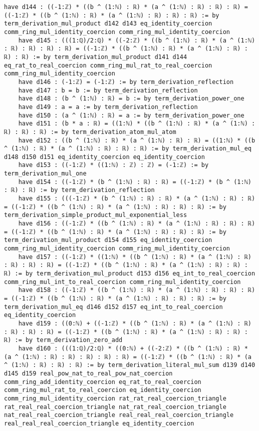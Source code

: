 \documentclass{article}
\begin{document}
\begin{tcolorbox}[colback=white!10, width=\linewidth]
\begin{lstlisting}[language=Lean4]
    have d144 : ((-1:ℤ) * ((b ^ (1:ℕ) : ℝ) * (a ^ (1:ℕ) : ℝ) : ℝ) : ℝ) = ((-1:ℤ) * ((b ^ (1:ℕ) : ℝ) * (a ^ (1:ℕ) : ℝ) : ℝ) : ℝ) := by term_derivation_mul_product d142 d143 eq_identity_coercion comm_ring_mul_identity_coercion comm_ring_mul_identity_coercion
    have d145 : (((1:ℚ)/2:ℚ) * ((-2:ℤ) * ((b ^ (1:ℕ) : ℝ) * (a ^ (1:ℕ) : ℝ) : ℝ) : ℝ) : ℝ) = ((-1:ℤ) * ((b ^ (1:ℕ) : ℝ) * (a ^ (1:ℕ) : ℝ) : ℝ) : ℝ) := by term_derivation_mul_product d141 d144 eq_rat_to_real_coercion comm_ring_mul_rat_to_real_coercion comm_ring_mul_identity_coercion
    have d146 : (-1:ℤ) = (-1:ℤ) := by term_derivation_reflection
    have d147 : b = b := by term_derivation_reflection
    have d148 : (b ^ (1:ℕ) : ℝ) = b := by term_derivation_power_one
    have d149 : a = a := by term_derivation_reflection
    have d150 : (a ^ (1:ℕ) : ℝ) = a := by term_derivation_power_one
    have d151 : (b * a : ℝ) = ((1:ℕ) * ((b ^ (1:ℕ) : ℝ) * (a ^ (1:ℕ) : ℝ) : ℝ) : ℝ) := by term_derivation_atom_mul_atom
    have d152 : ((b ^ (1:ℕ) : ℝ) * (a ^ (1:ℕ) : ℝ) : ℝ) = ((1:ℕ) * ((b ^ (1:ℕ) : ℝ) * (a ^ (1:ℕ) : ℝ) : ℝ) : ℝ) := by term_derivation_mul_eq d148 d150 d151 eq_identity_coercion eq_identity_coercion
    have d153 : ((-1:ℤ) * ((1:ℕ) : ℤ) : ℤ) = (-1:ℤ) := by term_derivation_mul_one
    have d154 : ((-1:ℤ) * (b ^ (1:ℕ) : ℝ) : ℝ) = ((-1:ℤ) * (b ^ (1:ℕ) : ℝ) : ℝ) := by term_derivation_reflection
    have d155 : (((-1:ℤ) * (b ^ (1:ℕ) : ℝ) : ℝ) * (a ^ (1:ℕ) : ℝ) : ℝ) = ((-1:ℤ) * ((b ^ (1:ℕ) : ℝ) * (a ^ (1:ℕ) : ℝ) : ℝ) : ℝ) := by term_derivation_simple_product_mul_exponential_less
    have d156 : ((-1:ℤ) * ((b ^ (1:ℕ) : ℝ) * (a ^ (1:ℕ) : ℝ) : ℝ) : ℝ) = ((-1:ℤ) * ((b ^ (1:ℕ) : ℝ) * (a ^ (1:ℕ) : ℝ) : ℝ) : ℝ) := by term_derivation_mul_product d154 d155 eq_identity_coercion comm_ring_mul_identity_coercion comm_ring_mul_identity_coercion
    have d157 : ((-1:ℤ) * ((1:ℕ) * ((b ^ (1:ℕ) : ℝ) * (a ^ (1:ℕ) : ℝ) : ℝ) : ℝ) : ℝ) = ((-1:ℤ) * ((b ^ (1:ℕ) : ℝ) * (a ^ (1:ℕ) : ℝ) : ℝ) : ℝ) := by term_derivation_mul_product d153 d156 eq_int_to_real_coercion comm_ring_mul_int_to_real_coercion comm_ring_mul_identity_coercion
    have d158 : ((-1:ℤ) * ((b ^ (1:ℕ) : ℝ) * (a ^ (1:ℕ) : ℝ) : ℝ) : ℝ) = ((-1:ℤ) * ((b ^ (1:ℕ) : ℝ) * (a ^ (1:ℕ) : ℝ) : ℝ) : ℝ) := by term_derivation_mul_eq d146 d152 d157 eq_int_to_real_coercion eq_identity_coercion
    have d159 : ((0:ℕ) + ((-1:ℤ) * ((b ^ (1:ℕ) : ℝ) * (a ^ (1:ℕ) : ℝ) : ℝ) : ℝ) : ℝ) = ((-1:ℤ) * ((b ^ (1:ℕ) : ℝ) * (a ^ (1:ℕ) : ℝ) : ℝ) : ℝ) := by term_derivation_zero_add
    have d160 : (((1:ℚ)/2:ℚ) * ((0:ℕ) + ((-2:ℤ) * ((b ^ (1:ℕ) : ℝ) * (a ^ (1:ℕ) : ℝ) : ℝ) : ℝ) : ℝ) : ℝ) = ((-1:ℤ) * ((b ^ (1:ℕ) : ℝ) * (a ^ (1:ℕ) : ℝ) : ℝ) : ℝ) := by term_derivation_literal_mul_sum d139 d140 d145 d159 real_pow_nat_to_real_pow_nat_coercion comm_ring_add_identity_coercion eq_rat_to_real_coercion comm_ring_mul_rat_to_real_coercion eq_identity_coercion comm_ring_mul_identity_coercion rat_rat_real_coercion_triangle rat_real_real_coercion_triangle nat_rat_real_coercion_triangle nat_real_real_coercion_triangle real_real_real_coercion_triangle real_real_real_coercion_triangle eq_identity_coercion

\end{lstlisting}
\end{tcolorbox}
\end{document}
